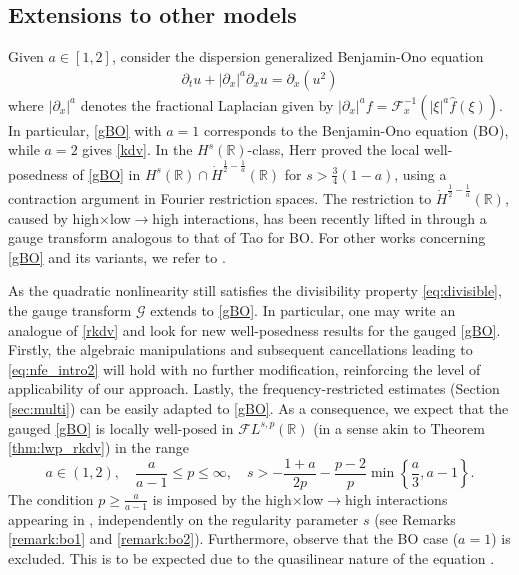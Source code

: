 \documentclass[a4paper,
11pt,  reqno]{amsart}
\newcommand{\5}{\textup{V}}
\newcommand{\FL}{\mathcal{F} L}
\newcommand{\ft}{\widehat}
\newcommand{\dx}{\partial_x}
\newcommand{\dt}{\partial_t}
\theoremstyle{remark}
\newcommand{\R}{\mathbb{R}}
\newcommand{\Ft}{{\mathcal{F}}}
\newcommand{\Gc}{\mathcal{G}}
\numberwithin{equation}{section}
\numberwithin{theorem}{section}
\begin{document}
		

    

\subsection{Extensions to other models}
\label{sec:dgbo}

Given $a \in [1,2]$, consider the dispersion generalized Benjamin-Ono equation
\begin{align}
\label{gBO}\tag{dgBO}
\dt u + |\dx|^a \dx u = \dx (u^2)
\end{align}
where $|\dx|^a$ denotes the fractional Laplacian given by $|\dx|^a f = \Ft_{x}^{-1} (|\xi|^a \ft f (\xi))$. 
In particular, \eqref{gBO} with $a=1$ corresponds to the Benjamin-Ono equation (BO), while $a=2$ gives \eqref{kdv}. In the $H^s(\R)$-class, Herr \cite{herr_bo} proved the local well-posedness of \eqref{gBO} in $H^s (\R) \cap \dot H^{\frac12-\frac 1a}(\R)$ for $s>\frac{3}{4}(1-a)$, using a contraction argument in Fourier restriction spaces. The restriction to $\dot H^{\frac12-\frac 1a}(\R)$, caused by high$\times$low$\to$high interactions, has been recently lifted in \cite{AiLiu} through a gauge transform analogous to that of Tao \cite{tao_bo} for BO. For other works concerning \eqref{gBO} and its variants, we refer to \cite{CamposLinaresSantos, FarahLinaresPastor_bo, Jockel, KenigMartelRobbiano}.

As the quadratic nonlinearity still satisfies the divisibility property \eqref{eq:divisible},  the gauge transform $\Gc$ extends to \eqref{gBO}.  
In particular, one may write an analogue of \eqref{rkdv} and look for new well-posedness results for the gauged \eqref{gBO}. Firstly, the algebraic manipulations and subsequent cancellations leading to \eqref{eq:nfe_intro2} will hold with no further modification, reinforcing the level of applicability of our approach. Lastly, the frequency-restricted estimates (Section \ref{sec:multi}) can be easily adapted to \eqref{gBO}. As a consequence, we expect that the gauged \eqref{gBO} is locally well-posed in $\FL^{s,p}(\R)$ (in a sense akin to Theorem \ref{thm:lwp_rkdv}) in the range
\begin{equation}\label{eq:condicoes_bo}
a\in (1,2),\quad \frac{a}{a-1}\le p \le \infty,\quad s>-\frac{1+a}{2p} - \frac{p-2}{p}\min\left\{\frac{a}3, a-1\right\}.
\end{equation}
The condition $p\ge \frac{a}{a-1}$ is imposed by the high$\times$low$\to$high interactions appearing in \cite{herr_bo}, independently on the regularity parameter $s$ (see Remarks \ref{remark:bo1} and \ref{remark:bo2}). Furthermore, observe that the BO case ($a=1$) is excluded. This is to be expected due to the quasilinear nature of the equation \cite{KochTzvetkov_bo}.
\end{document}
